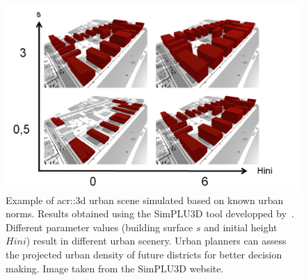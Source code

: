             \begin{figure}[htpb]
                \centering
                \includegraphics[width=\textwidth]{images/introduction/3d_model_applications/simplu}
                \caption[
                    Example of \acrshort*{acr::3d} urban scene simulated based on known urban norms.
                ]{
                    \label{fig::3d_simulation}
                    Example of \gls{acr::3d} urban scene simulated based on known urban norms.
                    Results obtained using the SimPLU3D tool developped by~\textcite{brasebin2017stochastic}.
                    Different parameter values (building surface \(s\) and initial height \(Hini\)) result in different urban scenery.
                    Urban planners can assess the projected urban density of future districts for better decision making.
                    Image taken from the SimPLU3D website\footnotemark.
                }
            \end{figure}
